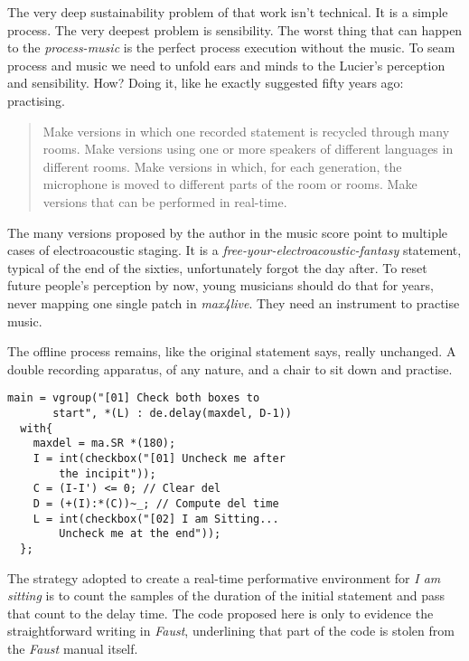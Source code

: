 \documentclass[twoside,a4paper]{article}
\begin{document}

The very deep sustainability problem of that work isn't technical. It is a simple process. The very deepest problem is sensibility. The worst thing that can happen to the \emph{process-music} is the perfect process execution without the music. To seam process and music we need to unfold ears and minds to the Lucier's perception and sensibility. How? Doing it, like he exactly suggested fifty years ago: practising.

\begin{quote}
Make versions in which one recorded statement is recycled through many rooms. Make versions using one or more speakers of different languages in different rooms. Make versions in which, for each generation, the microphone is moved to different parts of the room or rooms. Make versions that can be performed in real-time. \cite{lais69}
\end{quote}

The many versions proposed by the author in the music score point to multiple cases of electroacoustic staging. It is a \emph{free-your-electroacoustic-fantasy} statement, typical of the end of the sixties, unfortunately forgot the day after. To reset future people's perception by now, young musicians should do that for years, never mapping one single patch in \emph{max4live}. They need an instrument to practise music.

The offline process remains, like the original statement says, really unchanged. A double recording apparatus, of any nature, and a chair to sit down and practise.

\begin{lstlisting}
main = vgroup("[01] Check both boxes to
       start", *(L) : de.delay(maxdel, D-1))
  with{
    maxdel = ma.SR *(180);
    I = int(checkbox("[01] Uncheck me after
        the incipit"));
    C = (I-I') <= 0; // Clear del
    D = (+(I):*(C))~_; // Compute del time
    L = int(checkbox("[02] I am Sitting...
        Uncheck me at the end"));
  };
\end{lstlisting}

The strategy adopted to create a real-time performative environment for \emph{I am sitting} is to count the samples of the duration of the initial statement and pass that count to the delay time. The code proposed here is only to evidence the straightforward writing in \emph{Faust}, underlining that part of the code is stolen from the \emph{Faust} manual itself.
\end{document}
